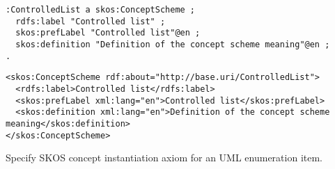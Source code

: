 \vspace{-\parskip}
\begin{minipage}[b]{.4\textwidth}
\begin{lstlisting}[language=Turtle, caption={Concept scheme instantiation in Turtle syntax}, captionpos=b]
:ControlledList a skos:ConceptScheme ;
  rdfs:label "Controlled list" ;
  skos:prefLabel "Controlled list"@en ;
  skos:definition "Definition of the concept scheme meaning"@en ;
.
\end{lstlisting}
\end{minipage}%
\quad\vspace{-\parskip}
\begin{minipage}[b]{.6\textwidth}
\begin{lstlisting}[language=RDF/XML, caption={Concept scheme instantiation in RDF/XML syntax}, captionpos=b]
<skos:ConceptScheme rdf:about="http://base.uri/ControlledList">
  <rdfs:label>Controlled list</rdfs:label>
  <skos:prefLabel xml:lang="en">Controlled list</skos:prefLabel>
  <skos:definition xml:lang="en">Definition of the concept scheme meaning</skos:definition>
</skos:ConceptScheme>
\end{lstlisting}
\end{minipage}
\vspace{-\parskip}

\enlargethispage{2em}
\begin{trule}
	\label{rule:enumeration-item-core}
	Specify SKOS concept instantiation axiom for an UML enumeration item.
\end{trule}

